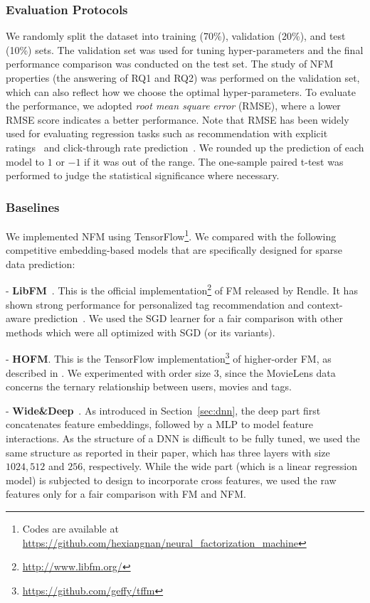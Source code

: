 \subsubsection{\textbf{Evaluation Protocols}} We randomly split the dataset into training (70\%), validation (20\%), and test (10\%) sets. The validation set was used for tuning hyper-parameters and the final performance comparison was conducted on the test set.
The study of NFM properties (\ie the answering of RQ1 and RQ2) was performed on the validation set, which can also reflect how we choose the optimal hyper-parameters. 
To evaluate the performance, we adopted \textit{root mean square error} (RMSE), where a lower RMSE score indicates a better performance. 
Note that RMSE has been widely used for evaluating regression tasks such as recommendation with explicit ratings~\cite{cao2017tois,fastFM} and click-through rate prediction~\cite{ImportanceFM}. 
We rounded up the prediction of each model to $1$ or $-1$ if it was out of the range. The one-sample paired t-test was performed to judge the statistical significance where necessary. 

\subsubsection{\textbf{Baselines}} 
We implemented NFM using TensorFlow\footnote{Codes are available at  \url{https://github.com/hexiangnan/neural_factorization_machine}}. We compared with the following competitive embedding-based models that are specifically designed for sparse data prediction:

- \textbf{LibFM}~\cite{libFM}. This is the official implementation\footnote{\url{http://www.libfm.org/}} of FM released by Rendle. It has shown strong performance for personalized tag recommendation and context-aware prediction~\cite{fastFM}. We used the SGD learner for a fair comparison with other methods which were all optimized with SGD (or its variants). 

- \textbf{HOFM}. This is the TensorFlow implementation\footnote{\url{https://github.com/geffy/tffm}} of higher-order FM, as described in \cite{FM}. We experimented with order size 3, since the MovieLens data concerns the ternary relationship between users, movies and tags.


- \textbf{Wide\&Deep}~\cite{WideDeep}. As introduced in Section~\ref{sec:dnn}, the deep part first concatenates feature embeddings, followed by a MLP to model feature interactions. As the structure of a DNN is difficult to be fully tuned, we used the same structure as reported in their paper, which has three layers with size $1024, 512$ and $256$, respectively. While the wide part (which is a linear regression model) is subjected to design to incorporate cross features, 
we used the raw features only for a fair comparison with FM and NFM. 


